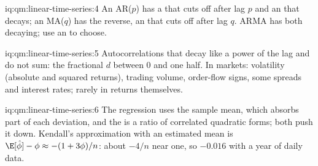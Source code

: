 \begin{solution}{iq:qm:linear-time-series:4}
An AR($p$) has a  that cuts off after lag $p$ and an  that decays; an MA($q$) has the reverse, an
 that cuts off after lag $q$. ARMA has both decaying; use an  to choose.
\end{solution}

\begin{solution}{iq:qm:linear-time-series:5}
Autocorrelations that decay like a power of the lag and do not sum: the fractional $d$ between 0 and one half. In markets: volatility (absolute and squared
returns), trading volume, order-flow signs, some spreads and interest rates; rarely in returns themselves.
\end{solution}

\begin{solution}{iq:qm:linear-time-series:6}
The regression uses the sample mean, which absorbs part of each deviation, and the  is a ratio of correlated quadratic forms; both push it down. Kendall's
approximation with an estimated mean is $\E[\hat\phi] - \phi \approx -(1 + 3\phi)/n$: about $-4/n$ near one, so $-0.016$ with a year of daily data.
\end{solution}
